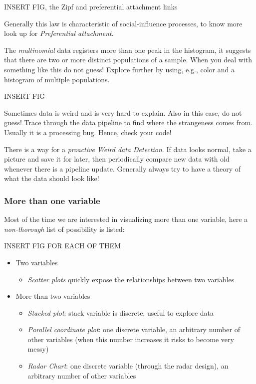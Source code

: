 INSERT FIG, the Zipf and preferential attachment links


Generally this law is characteristic of social-influence processes, to know more look up for \emph{Preferential attachment}.

The \emph{multinomial} data registers more than one peak in the histogram, it suggests that there are two or more distinct populations of a sample. When you deal with something like this do not guess! Explore further by using, e.g., color and a histogram of multiple populations. 


INSERT FIG


Sometimes data is weird and is very hard to explain. Also in this case, do not guess! Trace through the data pipeline to find where the strangeness comes from. Usually it is a processing bug. Hence, check your code!

There is a way for a \emph{proactive Weird data Detection}. If data looks normal, take a picture and save it for later, then periodically compare new data with old whenever there is a pipeline update. Generally always try to have a theory of what the data should look like!

\subsubsection{More than one variable}
 
Most of the time we are interested in visualizing more than one variable, here a \emph{non-thorough} list of possibility is listed:


 INSERT FIG FOR EACH OF THEM


\begin{itemize}
\item Two variables 
\begin{itemize}
\item \emph{Scatter plots} quickly expose the relationships between two variables
\end{itemize} 
\item  More than two variables
\begin{itemize}
\item \emph{Stacked plot}: stack variable is discrete, useful to explore data
\item \emph{Parallel coordinate plot}: one discrete variable, an arbitrary number of other variables (when this number increases it risks to become very messy)
\item \emph{Radar Chart}: one discrete variable (through the radar design), an arbitrary number of other variables
\end{itemize}
\end{itemize}





